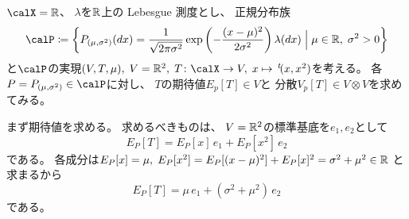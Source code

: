 \documentclass[report]{jlreq}
\begin{document}
\begin{example}
    $\calX = \R$、
    $\lambda$を$\mathbb{R}$上の Lebesgue 測度とし、
    正規分布族
    \begin{equation}
        \calP \coloneqq \mybrace{
            P_{(\mu, \sigma^2)}(dx)
                = \frac{1}{\sqrt{2\pi\sigma^2}} \exp\myparen{
                    -\frac{(x - \mu)^2}{2\sigma^2}
                } \lambda(dx)
            \;\Big|\;
            \mu \in \R, \; \sigma^2 > 0
        }
    \end{equation}
    と$\calP$の実現$(V, T, \mu), \;
        V = \R^2, \;
        T \colon \calX \to V, \;
        x \mapsto \up{t}(x, x^2)$を考える。
    各$P = P_{(\mu, \sigma^2)} \in \calP$に対し、
    $T$の期待値$E_p[T] \in V$と
    分散$V_p[T] \in V \otimes V$を求めてみる。

    まず期待値を求める。
    求めるべきものは、
    $V = \mathbb{R}^2$の標準基底を$e_1, e_2$として
    \begin{equation}
        E_P[T]
            = E_P[x] \, e_1 + E_P[x^2] \, e_2
    \end{equation}
    である。
    各成分は$E_P[x] = \mu, \;
        E_P[x^2]
            = E_P[(x - \mu)^2] + E_P[x]^2
            = \sigma^2 + \mu^2 \in \mathbb{R}$
    と求まるから
    \begin{equation}
        E_P[T]
            = \mu \, e_1 + (\sigma^2 + \mu^2) \, e_2
    \end{equation}
    である。


\end{example}
\end{document}
